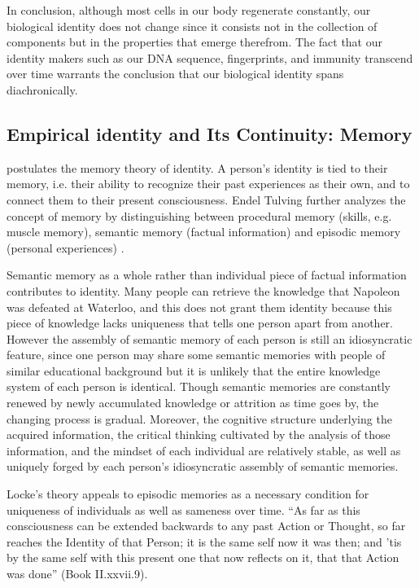 \documentclass[a4paper,english,12pt]{scrartcl}
\begin{document}
In conclusion, although most cells in our body regenerate constantly,
our biological identity does not change since it consists not in the
collection of components but in the properties that emerge therefrom.
The fact that our identity makers such as our DNA sequence, fingerprints,
and immunity transcend over time warrants the conclusion that our
biological identity spans diachronically.

\subsection{Empirical identity and Its Continuity: Memory}

\textcite{LockeHumanUnderstanding} postulates the memory theory of
identity. A person's identity is tied to their memory, i.e. their
ability to recognize their past experiences as their own, and to connect
them to their present consciousness. Endel Tulving further analyzes
the concept of memory by distinguishing between procedural memory
(skills, e.g. muscle memory), semantic memory (factual information)
and episodic memory (personal experiences) \parencite{OutOfThePast}. 

Semantic memory as a whole rather than individual piece of factual
information contributes to identity. Many people can retrieve the
knowledge that Napoleon was defeated at Waterloo, and this does not
grant them identity because this piece of knowledge lacks uniqueness
that tells one person apart from another. However the assembly of
semantic memory of each person is still an idiosyncratic feature,
since one person may share some semantic memories with people of similar
educational background but it is unlikely that the entire knowledge
system of each person is identical. Though semantic memories are constantly
renewed by newly accumulated knowledge or attrition as time goes by,
the changing process is gradual. Moreover, the cognitive structure
underlying the acquired information, the critical thinking cultivated
by the analysis of those information, and the mindset of each individual
are relatively stable, as well as uniquely forged by each person's
idiosyncratic assembly of semantic memories.

Locke's theory appeals to episodic memories as a necessary condition
for uniqueness of individuals as well as sameness over time. ``As
far as this consciousness can be extended backwards to any past Action
or Thought, so far reaches the Identity of that Person; it is the
same self now it was then; and 'tis by the same self with this present
one that now reflects on it, that that Action was done'' (Book II.xxvii.9).
\end{document}

